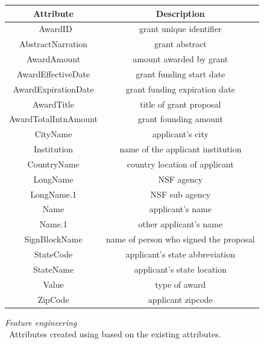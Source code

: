 \documentclass[11pt, oneside]{article}   	%
\begin{document}
\begin{center}
 \begin{tabular}{|c | c|} 
 \hline
 Attribute & Description\\
 \hline\
 AwardID & grant unique identifier \\ 
 AbstractNarration & grant abstract  \\ 
 AwardAmount & amount awarded by grant  \\ 
 AwardEffectiveDate &  grant funding start date \\
 AwardExpirationDate & grant funding expiration date \\
 AwardTitle & title of grant proposal \\
 AwardTotalIntnAmount & grant founding amount \\
 CityName & applicant's city \\
 Institution & name of the applicant institution \\
 CountryName & country location of applicant \\
 LongName & NSF agency \\
 LongName.1 & NSF sub agency \\
 Name & applicant's name \\
 Name.1 & other applicant's name \\
 SignBlockName & name of person who signed the proposal \\
 StateCode & applicant's state abbreviation \\
 StateName & applicant's state location \\
 Value & type of award \\
 ZipCode & applicant zipcode \\
 \hline
\end{tabular}
\end{center}
 
\emph{Feature engineering} \\
\ Attributes created using based on the existing attributes.
 
\end{document}
